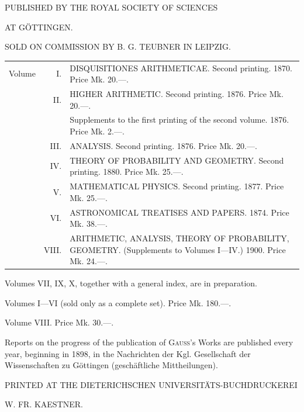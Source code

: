 \clearpage{}
\begin{center}
{\Large{}}\par\medskip
PUBLISHED BY THE ROYAL SOCIETY OF SCIENCES\par
AT GÖTTINGEN.\par\medskip
SOLD ON COMMISSION BY B. G. TEUBNER IN LEIPZIG.
\end{center}

\noindent\begin{tabular}{@{}l@{\quad}r@{\quad}p{.835\linewidth}@{}}
Volume&I.&DISQUISITIONES ARITHMETICAE. Second printing. 1870. Price Mk. 20.—.\\[.3em]
&II.&HIGHER ARITHMETIC. Second printing. 1876. Price Mk. 20.—.\\[.3em]
&&Supplements to the first printing of the second volume. 1876. Price Mk. 2.—.\\[.3em]
&III.&ANALYSIS. Second printing. 1876. Price Mk. 20.—.\\[.3em]
&IV.&THEORY OF PROBABILITY AND GEOMETRY. Second printing. 1880. Price Mk. 25.—.\\[.3em]
&V.&MATHEMATICAL PHYSICS. Second printing. 1877. Price Mk. 25.—.\\[.3em]
&VI.&ASTRONOMICAL TREATISES AND PAPERS. 1874. Price Mk. 38.—.\\[.3em]
&VIII.&ARITHMETIC, ANALYSIS, THEORY OF PROBABILITY, GEOMETRY. (Supplements to Volumes I—IV.) 1900. Price Mk. 24.—.
\end{tabular}

\medskip\noindent Volumes VII, IX, X, together with a general index, are in preparation.

\noindent Volumes I—VI (sold only as a complete set). Price Mk. 180.—.\par
\noindent Volume VIII. Price Mk. 30.—.

\bigskip
Reports on the progress of the publication of \textsc{Gauss}'s Works are published every year, beginning in 1898, in the Nachrichten der Kgl. Gesellschaft der Wissenschaften zu Göttingen (geschäftliche Mittheilungen).

\bigskip\begin{center}
{\large{}}\par\medskip
PRINTED AT THE DIETERICHSCHEN UNIVERSITÄTS-BUCHDRUCKEREI\par\medskip
W. FR. KAESTNER.
\end{center}
